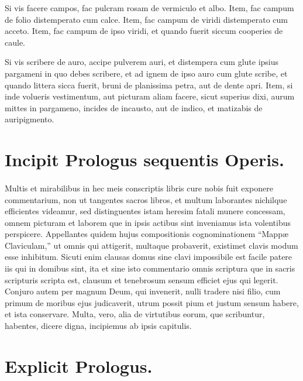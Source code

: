 \documentclass[a4paper, 11pt, oneside, polutonikogreek, italian]{article}
\begin{document}
Si vis facere campos, fac pulcram rosam de vermiculo et albo. Item, fac campum de folio distemperato cum calce. Item, fac campum de viridi distemperato cum acceto. Item, fac campum de ipso viridi, et quando fuerit siccum cooperies de caule.

Si vis scribere de auro, accipe pulverem auri, et distempera cum glute ipsius pargameni in quo debes scribere, et ad ignem de ipso auro cum glute scribe, et quando littera sicca fuerit, bruni de planissima petra, aut de dente apri. Item, si inde volueris vestimentum, aut picturam aliam facere, sicut superius dixi, aurum mittes in pargameno, incides de incausto, aut de indico, et matizabis de auripigmento.

\section{Incipit Prologus sequentis Operis.}
\paragraph{}
Multis et mirabilibus in hec meis conscriptis libris cure nobis fuit exponere commentarium, non ut tangentes sacros libros, et multum laborantes nichilque efficientes videamur, sed distinguentes istam heresim fatali munere concessam, omnem picturam et laborem que in ipsis actibus sint inveniamus ista volentibus perspicere. Appellantes quidem hujus compositionis cognominationem ``Mappæ Claviculam,'' ut omnis qui attigerit, multaque probaverit, existimet clavis modum esse inhibitum. Sicuti enim clausas domus sine clavi impossibile est facile patere iis qui in domibus sint, ita et sine isto commentario omnis scriptura que in sacris scripturis scripta est, clausum et tenebrosum sensum efficiet ejus qui legerit. Conjuro autem per magnum Deum, qui invenerit, nulli tradere nisi filio, cum primum de moribus ejus judicaverit, utrum possit pium et justum sensum habere, et ista conservare. Multa, vero, alia de virtutibus eorum, que scribuntur, habentes, dicere digna, incipiemus ab ipsis capitulis.

\section*{Explicit Prologus.}
\clearpage
\end{document}

